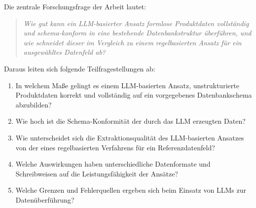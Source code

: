 Die zentrale Forschungsfrage der Arbeit lautet:

\begin{quote}
\textit{Wie gut kann ein LLM-basierter Ansatz formlose Produktdaten vollständig und schema-konform in eine bestehende Datenbankstruktur überführen, und wie schneidet dieser im Vergleich zu einem regelbasierten Ansatz für ein ausgewähltes Datenfeld ab?}
\end{quote}

Daraus leiten sich folgende Teilfragestellungen ab:

\begin{enumerate}
    \setlength{\itemsep}{0pt}
    \item In welchem Maße gelingt es einem LLM-basierten Ansatz, unstrukturierte Produktdaten korrekt und vollständig auf ein vorgegebenes Datenbankschema abzubilden?
    \item Wie hoch ist die Schema-Konformität der durch das LLM erzeugten Daten?
    \item Wie unterscheidet sich die Extraktionsqualität des LLM-basierten Ansatzes von der eines regelbasierten Verfahrens für ein Referenzdatenfeld?
    \item Welche Auswirkungen haben unterschiedliche Datenformate und Schreibweisen auf die Leistungsfähigkeit der Ansätze?
    \item Welche Grenzen und Fehlerquellen ergeben sich beim Einsatz von LLMs zur Datenüberführung?
\end{enumerate}